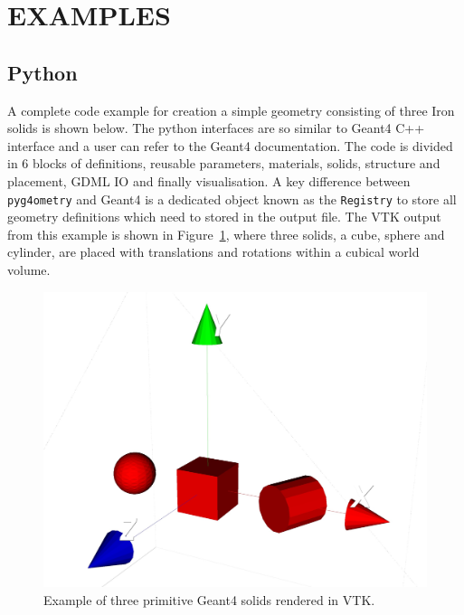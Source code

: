 \documentclass[a4paper,
               keeplastbox,   %
               ]{jacow}
\begin{document}
\section{EXAMPLES}
\subsection{Python}
A complete code example for creation a simple geometry consisting of three Iron solids is shown below. The python interfaces are so similar to Geant4 C++ interface and a user can refer to the Geant4 documentation.  
The code is divided in 6 blocks of definitions, reusable parameters, materials, solids, structure and placement, GDML IO and finally visualisation. A key difference between \verb|pyg4ometry| and Geant4 is a dedicated object known as the \verb|Registry| to store all geometry definitions which need to stored in the output file. The VTK output from this example is shown in Figure~\ref{fig:simple}, where three solids, a cube, sphere and cylinder, are placed with translations and rotations within a cubical world volume.
\begin{figure}[!htb]
   \centering
   \includegraphics*[width=.9\columnwidth]{./examples/simple.jpg}
   \caption{Example of three primitive Geant4 solids rendered in VTK.}
   \label{fig:simple}
\end{figure}
\end{document}
